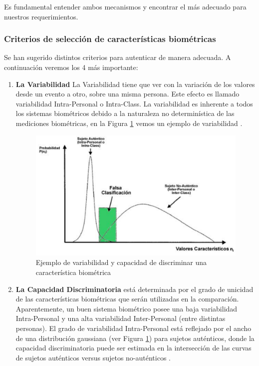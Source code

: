 Es fundamental entender ambos mecanismos y encontrar el más adecuado para nuestros requerimientos.

\subsubsection{Criterios de selección de características biométricas}

Se han sugerido distintos criterios para autenticar de manera adecuada. A continuación veremos los 4 más importante:
\begin{enumerate}
\item \textbf{La Variabilidad} La Variabilidad tiene que ver con la variación de los valores desde un evento a otro, sobre una misma persona. Este efecto es llamado variabilidad Intra-Personal o Intra-Class. La variabilidad es inherente a todos los sistemas biométricos debido a la naturaleza no determinística de las mediciones biométricas, en la Figura \ref{la_variabilidad} vemos un ejemplo de variabilidad  \cite{Way00}.

\begin{figure}[H]
\centering
\includegraphics[scale=0.3]{images/capitulo2/la_variabilidad.png}
\caption{Ejemplo de variabilidad y capacidad de discriminar una característica biométrica}
\label{la_variabilidad}
\end{figure}


\item \textbf{La Capacidad Discriminatoria}  está determinada por el grado de unicidad de las características biométricas que serán utilizadas en la comparación. Aparentemente, un buen sistema biométrico posee una baja variabilidad Intra-Personal y una alta variabilidad Inter-Personal (entre distintas personas). El grado de variabilidad Intra-Personal está reflejado por el ancho de una distribución gaussiana (ver Figura \ref{la_variabilidad}) para sujetos auténticos, donde la capacidad discriminatoria puede ser estimada en la intersección de las curvas de sujetos auténticos versus sujetos no-auténticos \cite{Zha00}.


\end{enumerate}
